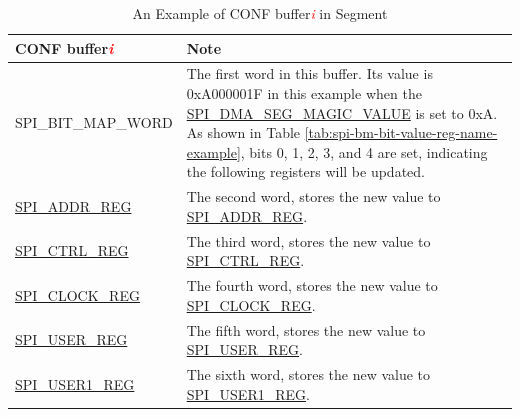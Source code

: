 \documentclass[main\_\_EN.tex]{subfiles}
\begin{document}
\vspace{-2em}
\begin{longtable}[c]{|L{3.5cm}|p{10cm}| }
\caption{An Example of CONF buffer\textcolor{red}{\it i} in Segment}
\label{tab:spi-example-conf-buffer-seg}\\\hline
{}
     \textbf{CONF buffer\textcolor{red}{\it i}} & \textbf{Note} \\\hline
     SPI\_BIT\_MAP\_WORD & The first word in this buffer. Its value is 0xA000001F in this example when the \hyperref[fielddesc:SPIDMASEGMAGICVALUE]{SPI\_DMA\_SEG\_MAGIC\_VALUE} is set to 0xA. As shown in Table \ref{tab:spi-bm-bit-value-reg-name-example}, bits 0, 1, 2, 3, and 4 are set, indicating the following registers will be updated. \\\hline

     \hyperref[regdesc:SPIADDRREG]{SPI\_ADDR\_REG} & The second word, stores the new value to \hyperref[regdesc:SPIADDRREG]{SPI\_ADDR\_REG}.
     \\\hline
     \hyperref[regdesc:SPICTRLREG]{SPI\_CTRL\_REG} & The third word, stores the new value to \hyperref[regdesc:SPICTRLREG]{SPI\_CTRL\_REG}.
     \\\hline
     \hyperref[regdesc:SPICLOCKREG]{SPI\_CLOCK\_REG} & The fourth word, stores the new value to \hyperref[regdesc:SPICLOCKREG]{SPI\_CLOCK\_REG}.
     \\\hline
     \hyperref[regdesc:SPIUSERREG]{SPI\_USER\_REG} & The    fifth word, stores the new value to \hyperref[regdesc:SPIUSERREG]{SPI\_USER\_REG}.
     \\\hline
     \hyperref[regdesc:SPIUSER1REG]{SPI\_USER1\_REG}  & The sixth word, stores the new value to \hyperref[regdesc:SPIUSER1REG]{SPI\_USER1\_REG}.
     \\\hline
\end{longtable}
\end{document}

